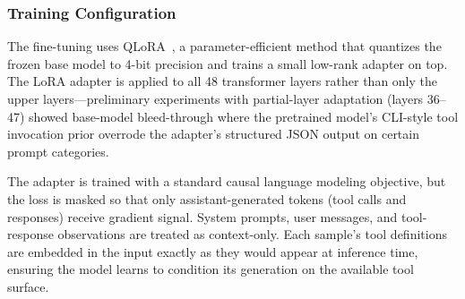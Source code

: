 \subsubsection{Training Configuration}

The fine-tuning uses QLoRA~\cite{dettmers2023qlora}, a parameter-efficient method that quantizes the frozen base model to 4-bit precision and trains a small low-rank adapter on top. The LoRA adapter is applied to all 48 transformer layers rather than only the upper layers---preliminary experiments with partial-layer adaptation (layers 36--47) showed base-model bleed-through where the pretrained model's CLI-style tool invocation prior overrode the adapter's structured JSON output on certain prompt categories.

The adapter is trained with a standard causal language modeling objective, but the loss is masked so that only assistant-generated tokens (tool calls and responses) receive gradient signal. System prompts, user messages, and tool-response observations are treated as context-only. Each sample's tool definitions are embedded in the input exactly as they would appear at inference time, ensuring the model learns to condition its generation on the available tool surface.
